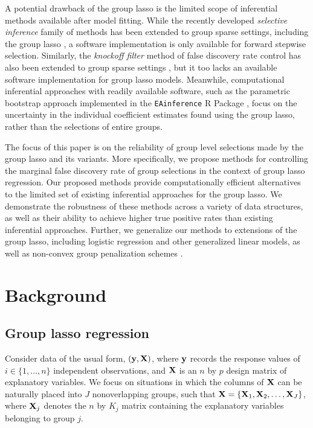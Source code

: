 A potential drawback of the group lasso is the limited scope of inferential methods available after model fitting.  While the recently developed \textit{selective inference} \citep{Selective_Inference} family of methods has been extended to group sparse settings, including the group lasso \citep{Yang2016}, a software implementation is only available for forward stepwise selection.  Similarly, the \textit{knockoff filter} method of false discovery rate control \citep{barber2015, candes2018} has also been extended to group sparse settings \citep{Dai2016}, but it too lacks an available software implementation for group lasso models.  Meanwhile, computational inferential approaches with readily available software, such as the parametric bootstrap approach implemented in the {\tt EAinference} R Package \citep{Zhou2017}, focus on the uncertainty in the individual coefficient estimates found using the group lasso, rather than the selections of entire groups.

The focus of this paper is on the reliability of group level selections made by the group lasso and its variants.  More specifically, we propose methods for controlling the marginal false discovery rate of group selections in the context of group lasso regression.  Our proposed methods provide computationally efficient alternatives to the limited set of existing inferential approaches for the group lasso.  We demonstrate the robustness of these methods across a variety of data structures, as well as their ability to achieve higher true positive rates than existing inferential approaches.  Further, we generalize our methods to extensions of the group lasso, including logistic regression and other generalized linear models, as well as non-convex group penalization schemes \citep{Breheny2012}.



\section{Background}

\subsection{Group lasso regression}

Consider data of the usual form, $(\mathbf{y}, \mathbf{X})$, where $\mathbf{y}$ records the response values of $i \in \{1, \ldots, n\}$ independent observations, and $\mathbf{X}$ is an $n$ by $p$ design matrix of explanatory variables.  We focus on situations in which the columns of $\mathbf{X}$ can be naturally placed into $J$ nonoverlapping groups, such that $\mathbf{X} = \{\mathbf{X}_1, \mathbf{X}_2, \ldots, \mathbf{X}_J\}$, where $\mathbf{X}_j$ denotes the $n$ by $K_j$ matrix containing the explanatory variables belonging to group $j$.  


